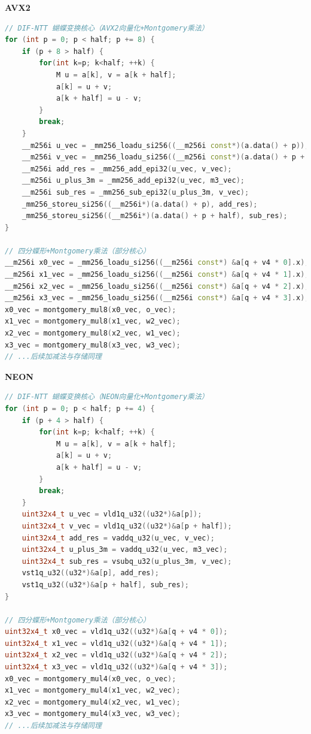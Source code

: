 \documentclass[a4paper,colorlinks=true,linkcolor=blue,urlcolor=blue,citecolor=green,bookmarks=true]{article}
\begin{document}
\textbf{AVX2}
\begin{lstlisting}[language=C++]
// DIF-NTT 蝴蝶变换核心（AVX2向量化+Montgomery乘法）
for (int p = 0; p < half; p += 8) {
    if (p + 8 > half) {
        for(int k=p; k<half; ++k) {
            M u = a[k], v = a[k + half];
            a[k] = u + v;
            a[k + half] = u - v;
        }
        break;
    }
    __m256i u_vec = _mm256_loadu_si256((__m256i const*)(a.data() + p));
    __m256i v_vec = _mm256_loadu_si256((__m256i const*)(a.data() + p + half));
    __m256i add_res = _mm256_add_epi32(u_vec, v_vec);
    __m256i u_plus_3m = _mm256_add_epi32(u_vec, m3_vec);
    __m256i sub_res = _mm256_sub_epi32(u_plus_3m, v_vec);
    _mm256_storeu_si256((__m256i*)(a.data() + p), add_res);
    _mm256_storeu_si256((__m256i*)(a.data() + p + half), sub_res);
}

// 四分蝶形+Montgomery乘法（部分核心）
__m256i x0_vec = _mm256_loadu_si256((__m256i const*) &a[q + v4 * 0].x);
__m256i x1_vec = _mm256_loadu_si256((__m256i const*) &a[q + v4 * 1].x);
__m256i x2_vec = _mm256_loadu_si256((__m256i const*) &a[q + v4 * 2].x);
__m256i x3_vec = _mm256_loadu_si256((__m256i const*) &a[q + v4 * 3].x);
x0_vec = montgomery_mul8(x0_vec, o_vec);
x1_vec = montgomery_mul8(x1_vec, w2_vec);
x2_vec = montgomery_mul8(x2_vec, w1_vec);
x3_vec = montgomery_mul8(x3_vec, w3_vec);
// ...后续加减法与存储同理
\end{lstlisting}

\textbf{NEON}
\begin{lstlisting}[language=C++]
// DIF-NTT 蝴蝶变换核心（NEON向量化+Montgomery乘法）
for (int p = 0; p < half; p += 4) {
    if (p + 4 > half) {
        for(int k=p; k<half; ++k) {
            M u = a[k], v = a[k + half];
            a[k] = u + v;
            a[k + half] = u - v;
        }
        break;
    }
    uint32x4_t u_vec = vld1q_u32((u32*)&a[p]);
    uint32x4_t v_vec = vld1q_u32((u32*)&a[p + half]);
    uint32x4_t add_res = vaddq_u32(u_vec, v_vec);
    uint32x4_t u_plus_3m = vaddq_u32(u_vec, m3_vec);
    uint32x4_t sub_res = vsubq_u32(u_plus_3m, v_vec);
    vst1q_u32((u32*)&a[p], add_res);
    vst1q_u32((u32*)&a[p + half], sub_res);
}

// 四分蝶形+Montgomery乘法（部分核心）
uint32x4_t x0_vec = vld1q_u32((u32*)&a[q + v4 * 0]);
uint32x4_t x1_vec = vld1q_u32((u32*)&a[q + v4 * 1]);
uint32x4_t x2_vec = vld1q_u32((u32*)&a[q + v4 * 2]);
uint32x4_t x3_vec = vld1q_u32((u32*)&a[q + v4 * 3]);
x0_vec = montgomery_mul4(x0_vec, o_vec);
x1_vec = montgomery_mul4(x1_vec, w2_vec);
x2_vec = montgomery_mul4(x2_vec, w1_vec);
x3_vec = montgomery_mul4(x3_vec, w3_vec);
// ...后续加减法与存储同理
\end{lstlisting}
\end{document}
